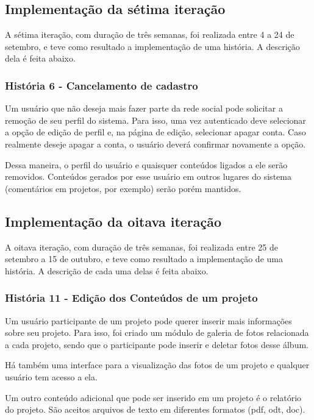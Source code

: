 \subsection{Implementação da sétima iteração}
    A sétima iteração, com duração de três semanas, foi realizada entre 4 a 24 de setembro, e teve como resultado a implementação de uma história. A descrição dela é feita abaixo.

    \subsubsection{História 6 - Cancelamento de cadastro}
      Um usuário que não deseja mais fazer parte da rede social pode solicitar a remoção de seu perfil do sistema. Para isso, uma vez autenticado deve selecionar a opção de edição de perfil e, na página de edição, selecionar apagar conta. Caso realmente deseje apagar a conta, o usuário deverá confirmar novamente a opção.

      Dessa maneira, o perfil do usuário e quaisquer conteúdos ligados a ele serão removidos. Conteúdos gerados por esse usuário em outros lugares do sistema (comentários em projetos, por exemplo) serão porém mantidos.

 \subsection{Implementação da oitava iteração}
    A oitava iteração, com duração de três semanas, foi realizada entre 25 de setembro a 15 de outubro, e teve como resultado a implementação de uma história. A descrição de cada uma delas é feita abaixo. 

    \subsubsection{História 11 - Edição dos Conteúdos de um projeto}

      Um usuário participante de um projeto pode querer inserir mais informações sobre seu projeto. Para isso, foi criado um módulo de galeria de fotos relacionada a cada projeto, sendo que o participante pode inserir e deletar fotos desse álbum. 
      
      Há também uma interface para a visualização das fotos de um projeto e qualquer usuário tem acesso a ela.

      Um outro conteúdo adicional que pode ser inserido em um projeto é o relatório do projeto. São aceitos arquivos de texto em diferentes formatos (pdf, odt, doc).

